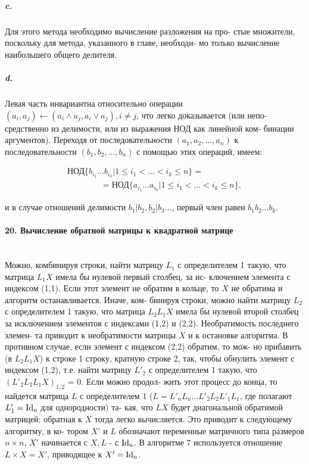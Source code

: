 {\subparagraph{c.} Для этого метода необходимо вычисление разложения на про-
стые множители, поскольку для метода, указанного в главе, необходи-
мо только вычисление наибольшего общего делителя.

\subparagraph{d.} Левая часть инвариантна относительно операции 
$(a_i,a_j) \longleftarrow (a_i \wedge a_{j},a_i \vee a_j), i \neq j$, что легко доказывается (или непо-
средственно из делимости, или из выражения НОД как линейной ком-
бинации аргументов). Переходя от последовательности $(a_1,a_2,\ldots,a_n)$
к последовательности $(b_1,b_2,\ldots,b_n)$ с помощью этих операций, имеем:

\begin{eqnarray*}
& \text{НОД}\{b_{i_1}\ldots b_{i_k} | 1 \leqslant i_1 < \dots < i_k \leqslant n\} =    & \\
& \qquad\qquad=\text{НОД}\{a_{i_1} \ldots a_{i_k} | 1 \leqslant i_1 < \dots < i_k \leqslant n\}, &
\end{eqnarray*}

\noindent и в случае отношений делимости $b_1 | b_2, b_2 | b_3 \ldots$, первый член равен
$b_{1}b_{2}\ldots b_k$.




\paragraph{20. Вычисление обратной матрицы к квадратной матрице} \mbox{}\\


Можно, комбинируя строки, найти матрицу $L_1$ с определителем 1
такую, что матрица $L_{1}X$ имела бы нулевой первый столбец, за ис-
ключением элемента с индексом (1,1). Если этот элемент не обратим
в кольце, то $X$ не обратима и алгоритм останавливается. Иначе, ком-
бинируя строки, можно найти матрицу $L_2$ с определителем 1 такую,
что матрица $L_{2}L_{1}X$ имела бы нулевой второй столбец за исключением
элементов с индексами (1,2) и (2,2). Необратимость последнего элемен-
та приводит к необратимости матрицы $X$ и к остановке алгоритма.
В противном случае, если элемент с индексом (2,2) обратим, то мож-
но прибавить (в $L_{2}L_{1}X$) к строке 1 строку, кратную строке 2, так,
чтобы обнулить элемент с индексом (1,2), т.е. найти матрицу $L'_{2}$ с
определителем 1 такую, что $(L'_{2}L_{2}L_{1}X)_{1,2}$ = 0. Если можно продол-
жить этот процесс до конца, то найдется матрица $L$ с определителем 1
($L = L'_{n}L_{n}\ldots L'_{2}L_{2}L'_{1}L_{1}$, где полагают $L'_{1} = \rm{I}{d_n}$ для однородности) та-
кая, что $LX$ будет диагональной обратимой матрицей; обратная к $X$
тогда легко вычисляется. Это приводит к следующему алгоритму, в ко-
тором $X'$ и $L$ обозначают переменные матричного типа размеров $n \times n$,
$X'$ начинается с $X, L$ - с $\rm{I}{d_n}$. В алгоритме 7 используется отношение
$L \times X = X'$, приводящее к $X' = \rm{I}{d_n}$.

}
